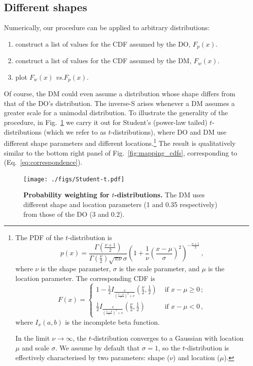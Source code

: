 \documentclass[a4paper, 12pt]{article}
\newcommand{\eref}[1]{(Eq.~\ref{eq:#1})}
\newcommand{\flabel}[1]{\label{fig:#1}}
\newcommand{\fref}[1]{Fig.~\ref{fig:#1}}
\newcommand{\seclabel}[1]{\label{sec:#1}}
\newcommand{\vs}{\textit{vs.}\xspace}
\newcommand{\be}{\begin{equation}}
\newcommand{\ee}{\end{equation}}
\begin{document}
\FloatBarrier

\subsection{Different shapes\seclabel{Different_shapes}}
Numerically, our procedure can be applied to arbitrary distributions:
\begin{enumerate}
\item
construct a list of values for the CDF assumed by the DO, $F_p(x)$.
\item
construct a list of values for the CDF assumed by the DM, $F_w(x)$.
\item
plot $F_w(x)$ \vs $F_p(x)$.
\end{enumerate}
Of course, the DM could even assume a distribution whose shape differs from that of the DO's distribution.
The inverse-S arises whenever a DM assumes a greater scale for a unimodal distribution.
To illustrate the generality of the procedure, in \fref{Student-t} we carry it out for Student's (power-law tailed) $t$-distributions (which we refer to as $t$-distributions), where DO and DM use different shape parameters and different locations.\footnote{
The PDF of the $t$-distribution is
%
\be
p\left(x\right) = \frac{\Gamma\left(\frac{\nu+1}{2}\right)} {\Gamma\left(\frac{\nu}{2}\right)\sqrt{\pi\nu}\sigma} \left(1+\frac{1}{\nu}\left(\frac{x-\mu}{\sigma}\right)^2 \right)^{-\frac{\nu+1}{2}}\,,
\ee
%
where $\nu$ is the shape parameter, $\sigma$ is the scale parameter, and $\mu$ is the location parameter. The corresponding CDF is
%
\be
F\left(x\right) =
\begin{cases}
1 - \frac{1}{2} I_{\frac{\nu}{\left(\frac{x-\mu}{\sigma}\right)^2 + \nu}}\left(\frac{\nu}{2},\frac{1}{2}\right) &\text{ if } x-\mu \geq 0\,;\\
\frac{1}{2} I_{\frac{\nu}{\left(\frac{x-\mu}{\sigma}\right)^2 + \nu}}\left(\frac{\nu}{2},\frac{1}{2}\right) &\text{ if } x-\mu < 0\,,
\end{cases}
\ee
%
where $I_x\left(a,b\right)$ is the incomplete beta function.

In the limit $\nu \rightarrow \infty$, the $t$-distribution converges to a Gaussian with location $\mu$ and scale $\sigma$. We assume by default that $\sigma = 1$, so the $t$-distribution is effectively characterised by two parameters: shape ($\nu$) and location ($\mu$).
}
The result is qualitatively similar to the bottom right panel of \fref{mapping_cdfs}, corresponding to \eref{correspondence}.
\begin{figure}[!htb]
\centering
\texttt{[image: ./figs/Student-t.pdf]}
\caption{\textbf{Probability weighting for $t$-distributions.} The DM uses different shape and location parameters (1 and 0.35 respectively) from those of the DO (3 and 0.2).}
\flabel{Student-t}
\end{figure}
\end{document}
